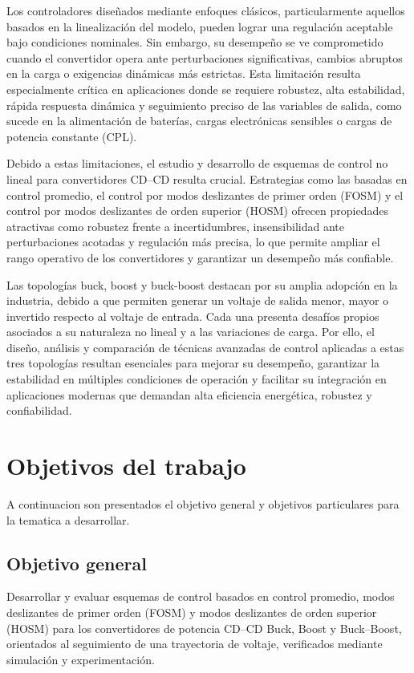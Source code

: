 \documentclass[12pt,oneside,openany]{book}
\begin{document}
Los controladores diseñados mediante enfoques clásicos, particularmente aquellos basados en la linealización del modelo, pueden lograr una regulación aceptable bajo condiciones nominales. Sin embargo, su desempeño se ve comprometido cuando el convertidor opera ante perturbaciones significativas, cambios abruptos en la carga o exigencias dinámicas más estrictas. Esta limitación resulta especialmente crítica en aplicaciones donde se requiere robustez, alta estabilidad, rápida respuesta dinámica y seguimiento preciso de las variables de salida, como sucede en la alimentación de baterías, cargas electrónicas sensibles o cargas de potencia constante (CPL).

Debido a estas limitaciones, el estudio y desarrollo de esquemas de control no lineal para convertidores CD–CD resulta crucial. Estrategias como las basadas en control promedio, el control por modos deslizantes de primer orden (FOSM) y el control por modos deslizantes de orden superior (HOSM) ofrecen propiedades atractivas como robustez frente a incertidumbres, insensibilidad ante perturbaciones acotadas y regulación más precisa, lo que permite ampliar el rango operativo de los convertidores y garantizar un desempeño más confiable.

Las topologías buck, boost y buck-boost destacan por su amplia adopción en la industria, debido a que permiten generar un voltaje de salida menor, mayor o invertido respecto al voltaje de entrada. Cada una presenta desafíos propios asociados a su naturaleza no lineal y a las variaciones de carga. Por ello, el diseño, análisis y comparación de técnicas avanzadas de control aplicadas a estas tres topologías resultan esenciales para mejorar su desempeño, garantizar la estabilidad en múltiples condiciones de operación y facilitar su integración en aplicaciones modernas que demandan alta eficiencia energética, robustez y confiabilidad.

\section{Objetivos del trabajo}


A continuacion son presentados el objetivo general y objetivos particulares para la tematica a desarrollar.

\subsection{Objetivo general}

Desarrollar y evaluar esquemas de control basados en control promedio, modos deslizantes de primer orden (FOSM) y modos deslizantes de orden superior (HOSM) para los convertidores de potencia CD–CD Buck, Boost y Buck–Boost, orientados al seguimiento de una trayectoria de voltaje, verificados mediante simulación y experimentación.
\end{document}
